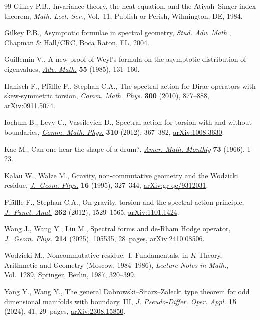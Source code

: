 \begin{thebibliography}{99}
Gilkey P.B., Invariance theory, the heat equation, and the {A}tiyah--{S}inger
 index theorem, \textit{Math. Lect. Ser.}, Vol.~11, Publish or Perish,
 Wilmington, DE, 1984.

Gilkey P.B., Asymptotic formulae in spectral geometry, \textit{Stud. Adv. Math.},
 Chapman \& Hall/CRC, Boca Raton, FL, 2004.

Guillemin V., A new proof of {W}eyl's formula on the asymptotic distribution of
 eigenvalues, \href{https://doi.org/10.1016/0001-8708(85)90018-0}{\textit{Adv.
 Math.}} \textbf{55} (1985), 131--160.

Hanisch F., Pf\"affle F., Stephan C.A., The spectral action for {D}irac
 operators with skew-symmetric torsion,
 \href{https://doi.org/10.1007/s00220-010-1135-3}{\textit{Comm. Math. Phys.}}
 \textbf{300} (2010), 877--888,
 \href{http://arxiv.org/abs/0911.5074}{arXiv:0911.5074}.

Iochum B., Levy C., Vassilevich D., Spectral action for torsion with and
 without boundaries,
 \href{https://doi.org/10.1007/s00220-011-1406-7}{\textit{Comm. Math. Phys.}}
 \textbf{310} (2012), 367--382,
 \href{http://arxiv.org/abs/1008.3630}{arXiv:1008.3630}.

Kac M., Can one hear the shape of a drum?,
 \href{https://doi.org/10.2307/2313748}{\textit{Amer. Math. Monthly}}
 \textbf{73} (1966), 1--23.

Kalau W., Walze M., Gravity, non-commutative geometry and the {W}odzicki
 residue, \href{https://doi.org/10.1016/0393-0440(94)00032-Y}{\textit{J.~Geom.
 Phys.}} \textbf{16} (1995), 327--344,
 \href{http://arxiv.org/abs/gr-qc/9312031}{arXiv:gr-qc/9312031}.

Pf\"affle F., Stephan C.A., On gravity, torsion and the spectral action
 principle, \href{https://doi.org/10.1016/j.jfa.2011.11.013}{\textit{J.~Funct.
 Anal.}} \textbf{262} (2012), 1529--1565,
 \href{http://arxiv.org/abs/1101.1424}{arXiv:1101.1424}.

Wang J., Wang Y., Liu M., Spectral forms and de-{R}ham {H}odge operator,
 \href{https://doi.org/10.1016/j.geomphys.2025.105535}{\textit{J.~Geom.
 Phys.}} \textbf{214} (2025), 105535, 28~pages,
 \href{http://arxiv.org/abs/2410.08506}{arXiv:2410.08506}.

Wodzicki M., Noncommutative residue.~{I}. {F}undamentals, in {$K$}-{T}heory,
 {A}rithmetic and {G}eometry ({M}oscow, 1984--1986), \textit{Lecture Notes in
 Math.}, Vol.~1289, \href{https://doi.org/10.1007/BFb0078372}{Springer},
 Berlin, 1987, 320--399.

Yang Y., Wang Y., The general {D}abrowski--{S}itarz--{Z}alecki type theorem for
 odd dimensional manifolds with boundary~{III},
 \href{https://doi.org/10.1007/s11868-024-00604-3}{\textit{J. Pseudo-Differ.
 Oper. Appl.}} \textbf{15} (2024), 41, 29~pages,
 \href{http://arxiv.org/abs/2308.15850}{arXiv:2308.15850}.

\end{thebibliography}
